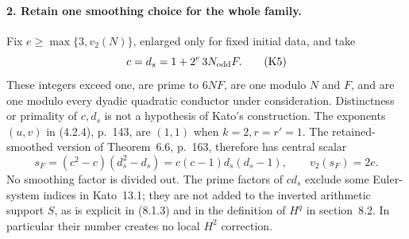 \paragraph{2. Retain one smoothing choice for the whole family.}
Fix $e\geq\max\{3,v_2(N)\}$, enlarged only for fixed initial data,
and take
\[
                 c=d_s=1+2^e\,3N_{\rm odd}F.              \tag{K5}
\]
These integers exceed one, are prime to $6NF$, are one modulo $N$
and $F$, and are one modulo every dyadic quadratic conductor under
consideration. Distinctness or primality of $c,d_s$ is not a
hypothesis of Kato's construction. The exponents $(u,v)$ in (4.2.4),
p.~143, are $(1,1)$ when $k=2,r=r'=1$. The retained-smoothed
version of Theorem~6.6, p.~163, therefore has central scalar
\[
 s_F=(c^2-c)(d_s^2-d_s)=c(c-1)d_s(d_s-1),
                   \qquad v_2(s_F)=2e.                   \tag{K6}
\]
No smoothing factor is divided out. The prime factors of $cd_s$
exclude some Euler-system indices in Kato~13.1; they are not added
to the inverted arithmetic support $S$, as is explicit in (8.1.3)
and in the definition of $H^q$ in section~8.2. In particular their
number creates no local $H^2$ correction.


